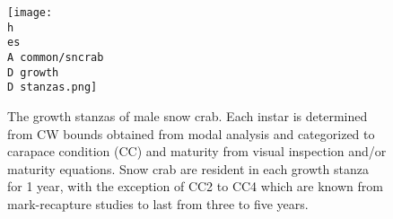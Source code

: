\documentclass[11pt]{article}
\newcommand{\D}{.}
\newcommand{\h}{C:/} %
\newcommand{\es}{bio.data/bio.snowcrab/} %
\newcommand{\ei}{bio.data/bio.indicators/}
\newcommand{\A}{assessments/}
\begin{document}



\begin{figure}
\centering
\texttt{[image: \\h \\es \\A common/sncrab\\D growth\\D stanzas.png]}
\caption{The growth stanzas of male snow crab. Each instar is determined from CW bounds obtained from modal analysis and categorized to carapace condition (CC) and maturity from visual inspection and/or maturity equations. Snow crab are resident in each growth stanza for 1 year, with the exception of CC2 to CC4 which are known from mark-recapture studies to last from three to five years.}
\end{figure}
\clearpage





\end{document}
